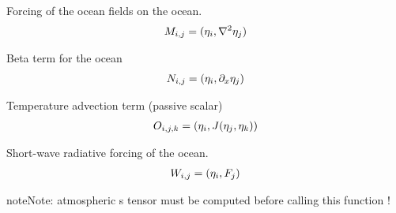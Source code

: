 \documentclass[letterpaper,10pt,english]{sphinxmanual}
\begin{document}
\begin{fulllineitems}
\begin{fulllineitems}
\end{fulllineitems}


\begin{fulllineitems}
\label{rstfiles/inprod_analytic:inprod_analytic.ocean_tensors.calculate_M}
Forcing of the ocean fields on the ocean.
\begin{gather}
\begin{split}M_{i,j} = (\eta_i, \nabla^2 \eta_j)\end{split}\notag
\end{gather}
\end{fulllineitems}


\begin{fulllineitems}
\label{rstfiles/inprod_analytic:inprod_analytic.ocean_tensors.calculate_N}
Beta term for the ocean
\begin{gather}
\begin{split}N_{i,j} = (\eta_i, \partial_x \eta_j)\end{split}\notag
\end{gather}
\end{fulllineitems}


\begin{fulllineitems}
\label{rstfiles/inprod_analytic:inprod_analytic.ocean_tensors.calculate_O}
Temperature advection term (passive scalar)
\begin{gather}
\begin{split}O_{i,j,k} = (\eta_i, J(\eta_j, \eta_k))\end{split}\notag
\end{gather}
\end{fulllineitems}


\begin{fulllineitems}
\label{rstfiles/inprod_analytic:inprod_analytic.ocean_tensors.calculate_W}
Short-wave radiative forcing of the ocean.
\begin{gather}
\begin{split}W_{i,j} = (\eta_i, F_j)\end{split}\notag
\end{gather}
\begin{notice}{note}{Note:}
atmospheric s tensor must be computed before calling
this function !
\end{notice}

\end{fulllineitems}


\end{fulllineitems}
\end{document}
